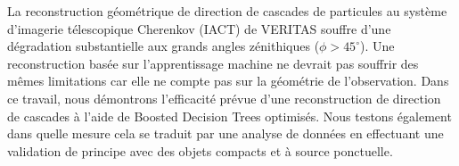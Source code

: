 \documentclass[main.tex]{subfiles}
\begin{document}
La reconstruction g\'eom\'etrique de direction de cascades de particules au système d'imagerie t\'elescopique Cherenkov (IACT) de VERITAS souffre d'une d\'egradation substantielle aux grands angles z\'enithiques ($ \phi> 45 ^{\circ} $). Une reconstruction bas\'ee sur l'apprentissage machine ne devrait pas souffrir des m\^emes limitations car elle ne compte pas sur la g\'eom\'etrie de l'observation. Dans ce travail, nous d\'emontrons l'efficacit\'e pr\'evue d'une reconstruction de direction de cascades \`a l'aide de Boosted Decision Trees optimis\'es. Nous testons \'egalement dans quelle mesure cela se traduit par une analyse de donn\'ees en effectuant une validation de principe avec des objets compacts et \`a source ponctuelle.
\end{document}
